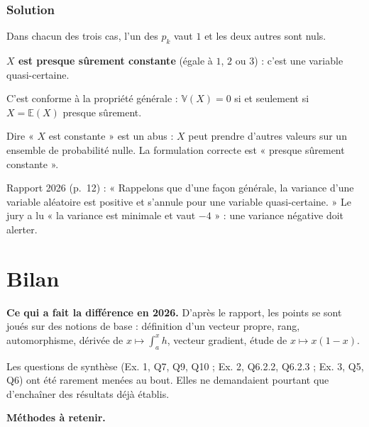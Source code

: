 \documentclass[11pt,a4paper]{article}
\begin{document}
\hypertarget{solution-41}{%
\subsubsection{Solution}\label{solution-41}}

Dans chacun des trois cas, l'un des \(p_k\) vaut \(1\) et les deux autres sont nuls.

\textbf{\(X\) est presque sûrement constante} (égale à \(1\), \(2\) ou \(3\)) : c'est une variable quasi-certaine.

C'est conforme à la propriété générale : \(\mathbb V(X)=0\) si et seulement si \(X=\mathbb E(X)\) presque sûrement.

\begin{piege}

Dire « \(X\) est constante » est un abus : \(X\) peut prendre d'autres valeurs sur un ensemble de probabilité nulle. La formulation correcte est « presque sûrement constante ».

\end{piege}

\begin{jury}

Rapport 2026 (p.~12) : « Rappelons que d'une façon générale, la variance d'une variable aléatoire est positive et s'annule pour une variable quasi-certaine. » Le jury a lu « la variance est minimale et vaut \(-4\) » : une variance négative doit alerter.

\end{jury}

\hypertarget{bilan}{%
\section{Bilan}\label{bilan}}

\textbf{Ce qui a fait la différence en 2026.} D'après le rapport, les points se sont joués sur des notions de base : définition d'un vecteur propre, rang, automorphisme, dérivée de \(x\mapsto\int_a^xh\), vecteur gradient, étude de \(x\mapsto x(1-x)\).

Les questions de synthèse (Ex. 1, Q7, Q9, Q10 ; Ex. 2, Q6.2.2, Q6.2.3 ; Ex. 3, Q5, Q6) ont été rarement menées au bout. Elles ne demandaient pourtant que d'enchaîner des résultats déjà établis.

\textbf{Méthodes à retenir.}
\end{document}
